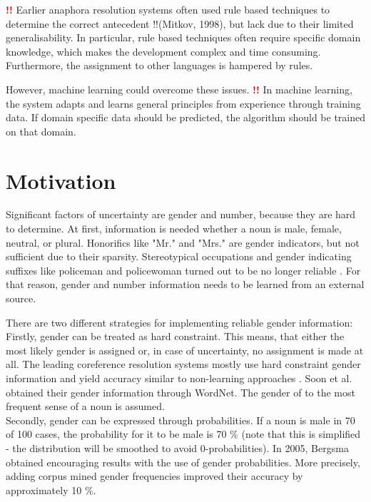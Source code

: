 \textcolor{red} {\textbf{!!}}
Earlier anaphora resolution systems often used rule based techniques to determine the correct antecedent !!(Mitkov, 1998), but lack due to their limited generalisability. In particular, rule based techniques often require specific domain knowledge, which makes the development complex and time consuming. Furthermore, the assignment to other languages is hampered by rules.

However, machine learning could overcome these issues.
\textcolor{red} {\textbf{!!}}  In machine learning, the system adapts and learns general principles from experience through training data. If domain specific data should be predicted, the algorithm should be trained on that domain.

\section{Motivation}
Significant factors of uncertainty are gender and number, because they are hard to determine. At first, information is needed whether a noun is male, female, neutral, or plural. Honorifics like "Mr." and "Mrs." are gender indicators, but not sufficient due to their sparsity. Stereotypical occupations and gender indicating suffixes like policeman and policewoman turned out to be no longer reliable \citep{evans2000improving}. For that reason, gender and number information needs to be learned from an external source. 

There are two different strategies for implementing reliable gender information: \\
Firstly, gender can be treated as hard constraint. This means, that either the most likely gender is assigned or, in case of uncertainty, no assignment is made at all. The leading coreference resolution systems mostly use hard constraint gender information and yield accuracy similar to non-learning approaches \citep{soon2001machine}. Soon et al. obtained their gender information through WordNet. The gender of to the most frequent sense of a noun is assumed.\\
Secondly, gender can be expressed through probabilities. If a noun is male in 70 of 100 cases, the probability for it to be male is 70 \% (note that this is simplified - the distribution will be smoothed to avoid 0-probabilities). In 2005, Bergsma obtained encouraging results with the use of gender probabilities. More precisely, adding corpus mined gender frequencies improved their accuracy by approximately 10 \%.

